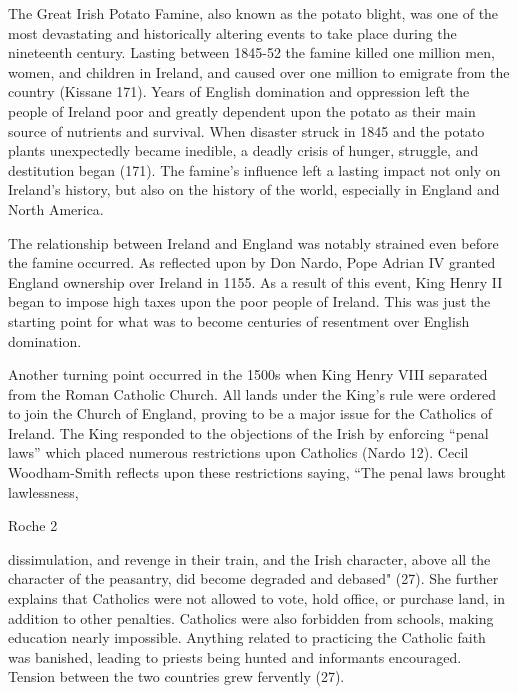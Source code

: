 \begin{Spacing}{1.5}

\hspace{.4in}The Great Irish Potato Famine, also known as the potato blight, was one of the most devastating and historically altering events to take place during the nineteenth century. Lasting between 1845-52 the famine killed one million men, women, and children in Ireland, and caused over one million to emigrate from the country (Kissane 171). Years of English domination and oppression left the people of Ireland poor and greatly dependent upon the potato as their main source of nutrients and survival. When disaster struck in 1845 and the potato plants unexpectedly became inedible, a deadly crisis of hunger, struggle, and destitution began (171). The famine’s influence left a lasting impact not only on Ireland’s history, but also on the history of the world, especially in England and North America.

\hspace{.4in}The relationship between Ireland and England was notably strained even before the famine occurred. As reflected upon by Don Nardo, Pope Adrian IV granted England ownership over Ireland in 1155. As a result of this event, King Henry II began to impose high taxes upon the poor people of Ireland. This was just the starting point for what was to become centuries of resentment over English domination. 

\hspace{.4in}Another turning point occurred in the 1500s when King Henry VIII separated from the Roman Catholic Church. All lands under the King’s rule were ordered to join the Church of England, proving to be a major issue for the Catholics of Ireland. The King responded to the objections of the Irish by enforcing “penal laws” which placed numerous restrictions upon Catholics (Nardo 12).  Cecil Woodham-Smith reflects upon these restrictions saying, “The penal laws brought lawlessness, 

\newpage
\thispagestyle{empty}
\begin{flushright}Roche 2\end{flushright}

dissimulation, and revenge in their train, and the Irish character, above all the character of the peasantry, did become degraded and debased" (27).  She further explains that Catholics were not allowed to vote, hold office, or purchase land, in addition to other penalties. Catholics were also forbidden from schools, making education nearly impossible. Anything related to practicing the Catholic faith was banished, leading to priests being hunted and informants encouraged. Tension between the two countries grew fervently (27). 


\end{Spacing}
